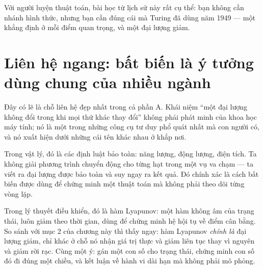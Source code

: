 \documentclass[../../algorithm.tex]{subfiles}
\begin{document}
Với người luyện thuật toán, bài học từ lịch sử này rất cụ thể: bạn không cần nhánh hình thức, nhưng bạn cần đúng cái mà Turing đã dùng năm 1949 --- một khẳng định ở mỗi điểm quan trọng, và một đại lượng giảm.

\begin{gocre}
\end{gocre}

\section{Liên hệ ngang: bất biến là ý tưởng dùng chung của nhiều ngành}

Đây có lẽ là chỗ liên hệ đẹp nhất trong cả phần A. Khái niệm ``một đại lượng không đổi trong khi mọi thứ khác thay đổi'' không phải phát minh của khoa học máy tính; nó là một trong những công cụ tư duy phổ quát nhất mà con người có, và nó xuất hiện dưới những cái tên khác nhau ở khắp nơi.

Trong vật lý, đó là các định luật bảo toàn: năng lượng, động lượng, điện tích. Ta không giải phương trình chuyển động cho từng hạt trong một vụ va chạm --- ta viết ra đại lượng được bảo toàn và suy ngay ra kết quả. Đó chính xác là cách bất biến được dùng để chứng minh một thuật toán mà không phải theo dõi từng vòng lặp.

Trong lý thuyết điều khiển, đó là hàm Lyapunov: một hàm không âm của trạng thái, luôn giảm theo thời gian, dùng để chứng minh hệ hội tụ về điểm cân bằng. So sánh với mục 2 của chương này thì thấy ngay: hàm Lyapunov \emph{chính là} đại lượng giảm, chỉ khác ở chỗ nó nhận giá trị thực và giảm liên tục thay vì nguyên và giảm rời rạc. Cùng một ý: gán một con số cho trạng thái, chứng minh con số đó đi đúng một chiều, và kết luận về hành vi dài hạn mà không phải mô phỏng.
\end{document}
